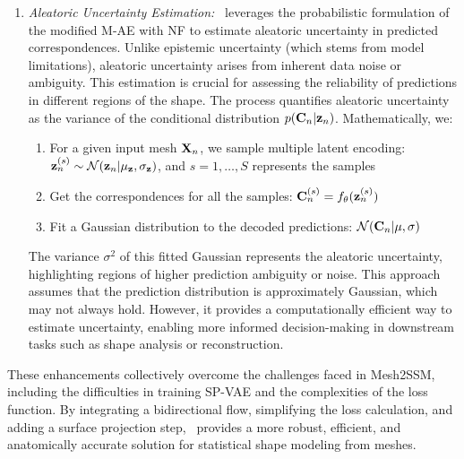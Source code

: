 \begin{enumerate}
\item \textit{Aleatoric Uncertainty Estimation:} \model~leverages the probabilistic formulation of the modified M-AE with NF to estimate aleatoric uncertainty in predicted correspondences. Unlike epistemic uncertainty (which stems from model limitations), aleatoric uncertainty arises from inherent data noise or ambiguity. This estimation is crucial for assessing the reliability of predictions in different regions of the shape. The process quantifies aleatoric uncertainty as the variance of the conditional distribution \(p(\mathbf{C}_n|\mathbf{z}_n)\). Mathematically, we:
\begin{enumerate}
    \item For a given input mesh \(\mathbf{X}_n\), we sample multiple latent encoding: \(\mathbf{z}^{(s)}_n\sim \mathcal{N}(\mathbf{z}_n|\mu_{\mathbf{z}},\sigma_{\mathbf{z}})\), and \(s=1,\ldots,S\) represents the samples
    \item Get the correspondences for all the samples: \(\mathbf{C}^{(s)}_n=f_{\theta}(\mathbf{z}^{(s)}_n)\)
    \item Fit a Gaussian distribution to the decoded predictions: \(\mathcal{N}(\mathbf{C}_n|\mu,\sigma)\)
\end{enumerate}
The variance \(\sigma^2\) of this fitted Gaussian represents the aleatoric uncertainty, highlighting regions of higher prediction ambiguity or noise. This approach assumes that the prediction distribution is approximately Gaussian, which may not always hold. However, it provides a computationally efficient way to estimate uncertainty, enabling more informed decision-making in downstream tasks such as shape analysis or reconstruction.

\end{enumerate}
These enhancements collectively overcome the challenges faced in Mesh2SSM, including the difficulties in training SP-VAE and the complexities of the loss function. By integrating a bidirectional flow, simplifying the loss calculation, and adding a surface projection step, \model~provides a more robust, efficient, and anatomically accurate solution for statistical shape modeling from meshes.

